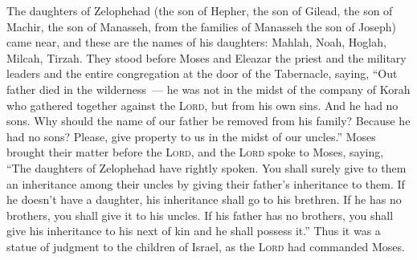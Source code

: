 
\begin{inparaenum}
     The daughters of Zelophehad (the son of Hepher, the son of Gilead, the son of Machir, the son of Manasseh, from the families of Manasseh the son of Joseph) came near, and these are the names of his daughters: Mahlah, Noah, Hoglah, Milcah, Tirzah.%
     They stood before Moses and Eleazar the priest and the military leaders and the entire congregation at the door of the Tabernacle, saying,%
     ``Out father died in the wilderness~--- he was not in the midst of the company of Korah who gathered together against the \textsc{Lord}, but from his own sins. And he had no sons.%
     Why should the name of our father be removed from his family? Because he had no sons? Please, give property to us in the midst of our uncles.''%
     Moses brought their matter before the \textsc{Lord},%
     and the \textsc{Lord} spoke to Moses, saying,%
     ``The daughters of Zelophehad have rightly spoken. You shall surely give to them an inheritance among their uncles by giving their father's inheritance to them.%
     If he doesn't have a daughter, his inheritance shall go to his brethren.%
     If he has no brothers, you shall give it to his uncles.%
     If his father has no brothers, you shall give his inheritance to his next of kin and he shall possess it.'' Thus it was a statue of judgment to the children of Israel, as the \textsc{Lord} had commanded Moses.%
\end{inparaenum}
